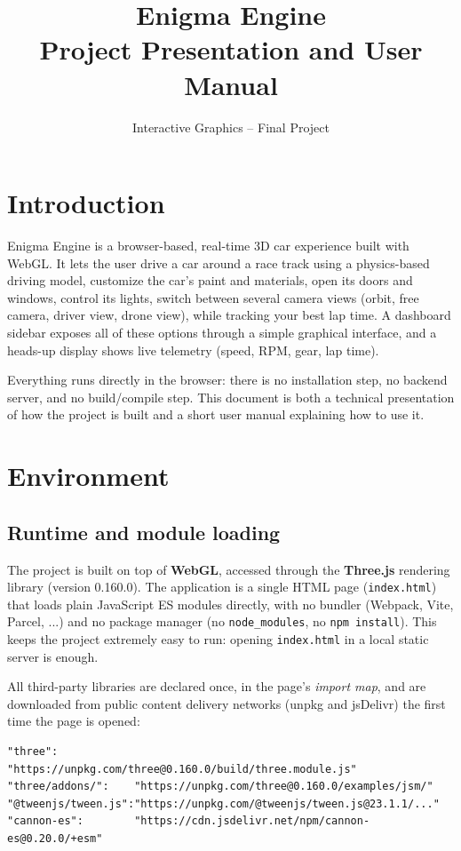 \documentclass[11pt]{article}
\title{Enigma Engine \\ \large Project Presentation and User Manual}
\author{Interactive Graphics -- Final Project}
\date{}
\begin{document}
\maketitle
\tableofcontents

\section{Introduction}

Enigma Engine is a browser-based, real-time 3D car experience built with
WebGL. It lets the user drive a car around a race track using a
physics-based driving model, customize the car's paint and materials, open
its doors and windows, control its lights, switch between several
camera views (orbit, free camera, driver view, drone view), while tracking your best lap time. A dashboard
sidebar exposes all of these options through a simple graphical interface,
and a heads-up display shows live telemetry (speed, RPM, gear, lap time).

Everything runs directly in the browser: there is no installation step, no
backend server, and no build/compile step. This document is both a
technical presentation of how the project is built and a short user manual
explaining how to use it.

\section{Environment}

\subsection{Runtime and module loading}
The project is built on top of \textbf{WebGL}, accessed through the
\textbf{Three.js} rendering library (version 0.160.0). The application is a
single HTML page (\texttt{index.html}) that loads plain JavaScript ES
modules directly, with no bundler (Webpack, Vite, Parcel, ...) and no
package manager (no \texttt{node\_modules}, no \texttt{npm install}). This
keeps the project extremely easy to run: opening \texttt{index.html} in a
local static server is enough.

All third-party libraries are declared once, in the page's \emph{import
map}, and are downloaded from public content delivery networks (unpkg and
jsDelivr) the first time the page is opened:

\begin{verbatim}
"three":            "https://unpkg.com/three@0.160.0/build/three.module.js"
"three/addons/":    "https://unpkg.com/three@0.160.0/examples/jsm/"
"@tweenjs/tween.js":"https://unpkg.com/@tweenjs/tween.js@23.1.1/..."
"cannon-es":        "https://cdn.jsdelivr.net/npm/cannon-es@0.20.0/+esm"
\end{verbatim}
\end{document}
